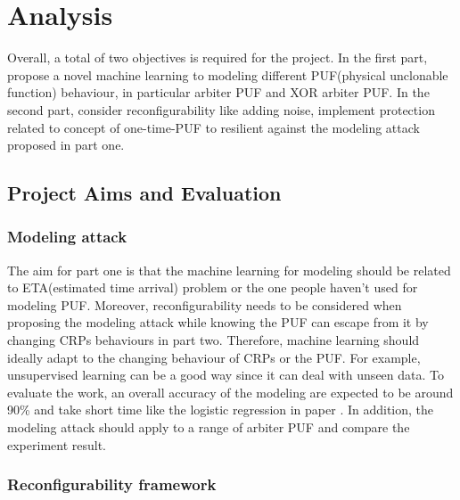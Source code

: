 \chapter{Analysis}
Overall, a total of two objectives is required for the project. In the first part, propose a novel machine learning to modeling different PUF(physical unclonable function)
behaviour, in particular arbiter PUF and XOR arbiter PUF. In the second part, consider reconfigurability like adding noise, implement protection related to concept of one-time-PUF to resilient against the modeling attack
proposed in part one.

\section{Project Aims and Evaluation}

\subsection{Modeling attack}
The aim for part one is that the machine learning for modeling should be related to ETA(estimated time arrival) problem or the one people haven't used for modeling
PUF. Moreover, reconfigurability needs to be considered when proposing the modeling attack while knowing the PUF can escape from it by changing CRPs behaviours in part 
two. Therefore, machine learning should ideally adapt to the changing behaviour of CRPs or the PUF. For example, unsupervised learning can be a good way since it can 
deal with unseen data. To evaluate the work, an overall accuracy of the modeling are expected to be around 90\% and take short time like the logistic regression in 
paper \cite{Reference6}. In addition, the modeling attack should apply to a range of arbiter PUF and compare the experiment result.

\subsection{Reconfigurability framework}

